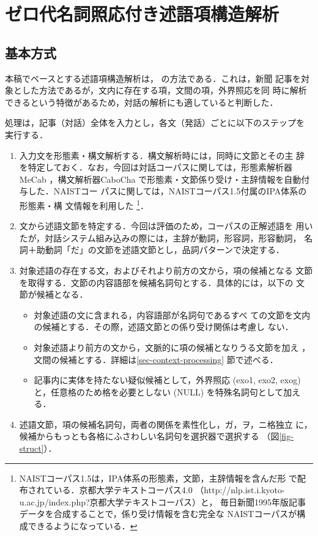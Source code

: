 \documentclass[japanese]{jnlp_1.4}
\begin{document}
\section{ゼロ代名詞照応付き述語項構造解析}
\label{sec-basic-strategy}

\subsection{基本方式}
\label{sec-architecture}

本稿でベースとする述語項構造解析は，
 の方法である．これは，新聞
記事を対象とした方法であるが，文内に存在する項，文間の項，外界照応を同
時に解析できるという特徴があるため，対話の解析にも適していると判断した．

処理は，記事（対話）全体を入力とし，各文（発話）ごとに以下のステップを
実行する．
\pagebreak

\begin{enumerate}
\item 入力文を形態素・構文解析する．構文解析時には，同時に文節とその主
辞を特定しておく．なお，今回は対話コーパスに関しては，形態素解析器
MeCab \cite{kudo-yamamoto-matsumoto:2004:EMNLP}
，構文解析器CaboCha \cite{Kudo:Cabocha2002}
で形態素・文節係り受け・主辞情報を自動付与した．NAISTコー
パスに関しては，NAISTコーパス1.5付属のIPA体系の形態素・構
文情報を利用した
\footnote{NAISTコーパス1.5は，IPA体系の形態素，文節，主辞情報を含んだ形
で配布されている．京都大学テキストコーパス4.0
（http://nlp.ist.i.kyoto-u.ac.jp/index.php?京都大学テキストコーパス）と，
毎日新聞1995年版記事データを合成することで，係り受け情報を含む完全な
NAISTコーパスが構成できるようになっている．}．
\item 文から述語文節を特定する．今回は評価のため，コーパスの正解述語を
用いたが，対話システム組み込みの際には，主辞が動詞，形容詞，形容動詞，
名詞＋助動詞「だ」の文節を述語文節とし，品詞パターンで決定する．
\item 対象述語の存在する文，およびそれより前方の文から，項の候補となる
文節を取得する．文節の内容語部を候補名詞句とする．具体的には，以下の
文節が候補となる．

\begin{itemize}
  \item 対象述語の文に含まれる，内容語部が名詞句であるすべ
  ての文節を文内の候補とする．その際，述語文節との係り受け関係は考慮し
  ない．
  \item 対象述語より前方の文から，文脈的に項の候補となりうる文節を加え
  ，文間の候補とする．詳細は\ref{sec-context-processing}
  節で述べる．
  \item 記事内に実体を持たない疑似候補として，外界照応 (exo1, exo2,
  exog) と，任意格のため格を必要としない (NULL) を特殊名詞句として加え
  る．
\end{itemize}
\item 述語文節，項の候補名詞句，両者の関係を素性化し，ガ，ヲ，ニ格独立
に，候補からもっとも各格にふさわしい名詞句を選択器で選択する
（図\ref{fig-struct}）．
\end{enumerate}
\end{document}
